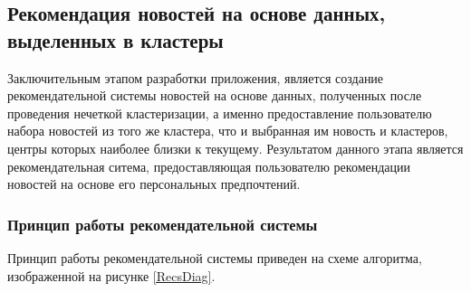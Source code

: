 \subsection{Рекомендация новостей на основе данных, выделенных в кластеры}

Заключительным этапом разработки приложения, является создание рекомендательной системы новостей на основе данных, полученных после проведения нечеткой кластеризации, а именно предоставление пользователю набора новостей из того же кластера, что и выбранная им новость и кластеров, центры которых наиболее близки к текущему. Результатом данного этапа является рекомендательная ситема, предоставляющая пользователю рекомендации новостей на основе его персональных предпочтений.

\subsubsection{Принцип работы рекомендательной системы}

Принцип работы рекомендательной системы приведен на схеме алгоритма, изображенной на рисунке \ref{RecsDiag}.

